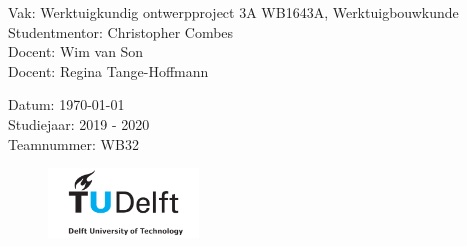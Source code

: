 \begin{titlepage}
\begin{flushleft}
 \begin{minipage}{.5\linewidth}
    \begin{flushleft}
      Vak:  Werktuigkundig ontwerpproject 3A WB1643A, Werktuigbouwkunde\\
      Studentmentor: Christopher Combes\\
      Docent: Wim van Son \\
      Docent: Regina Tange-Hoffmann
    \end{flushleft}
  \end{minipage}
  \hfill
  \begin{minipage}{.45\linewidth}
    \begin{flushright}
    Datum: \today\\
    Studiejaar: 2019 - 2020\\
    Teamnummer: WB32
    \end{flushright} 
\end{minipage}

\begin{figure}[h]
    \centering
    \includegraphics[width = 40mm]{01_title/TUDELFT_LOGO.png}
\end{figure}
  
  
\cleardoublepage
\thispagestyle{empty}
\end{flushleft}

\clearpage
\thispagestyle{empty}
\end{titlepage}